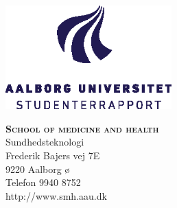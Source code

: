 




\begin{minipage}[t]{0.48\textwidth}
\vspace*{-25pt}			%
\includegraphics[height=4cm]{figures/aau_logo_da}
\end{minipage}
\hfill
\begin{minipage}[t]{0.48\textwidth}
{\small 
\noindent  \textsc{\textbf{School of medicine and health}}\\
Sundhedsteknologi \\
Frederik Bajers vej 7E \\
9220 Aalborg ø\\
Telefon 9940 8752 \\
http://www.smh.aau.dk}
\end{minipage}

\vspace*{0.5cm}

